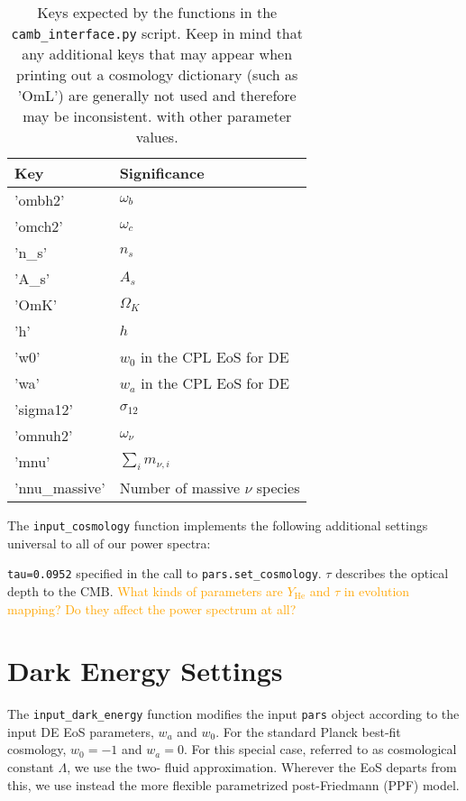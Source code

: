 \begin{table}[ht!]
\centering
\begin{tabular}{l|l}
\hline
Key & Significance \\ \hline
'ombh2' & $\omega_b$ \\
'omch2' & $\omega_c$ \\
'n\_s' & $n_s$ \\
'A\_s' & $A_s$ \\
'OmK' & $\Omega_K$ \\
'h' & $h$ \\
'w0' & $w_0$ in the CPL EoS for DE \\
'wa' & $w_a$ in the CPL EoS for DE \\
'sigma12' & $\sigma_{12}$\footnotemark \\
'omnuh2' & $\omega_\nu$ \\
'mnu' & $\sum_i m_{\nu, i}$ \\
'nnu\_massive' & Number of massive $\nu$ species \\ \hline
\end{tabular}
 \cprotect\caption[Cosmology Dictionary Keys]{Keys
 	expected by the functions in
 	the \verb|camb_interface.py| script. Keep in mind that any additional
 	keys that may appear when printing out a cosmology dictionary
 	(such as 'OmL') are generally not used and therefore may be inconsistent.
 	with other parameter values.}
 \label{tab: cosmology_dictionary}
\end{table}
 	

The \verb|input_cosmology| function implements the following additional
settings universal to all of our power spectra:

\verb|tau=0.0952| \quad specified in the call to \verb|pars.set_cosmology|.
$\tau$ describes the optical depth to the CMB. \textcolor{orange}{What kinds of parameters are $Y_\text{He}$ and $\tau$ in evolution mapping?
Do they affect the power spectrum at all?}


\section{Dark Energy Settings}

The \verb|input_dark_energy| function modifies the input \verb|pars| object
according to the input DE EoS parameters, $w_a$ and $w_0$. For the standard
Planck best-fit cosmology, $w_0 = -1$ and $w_a = 0$. For this special case,
referred to as cosmological constant $\Lambda$, we use the two-
fluid approximation. Wherever the EoS departs from this, we use instead the
more flexible parametrized post-Friedmann (PPF) model.

